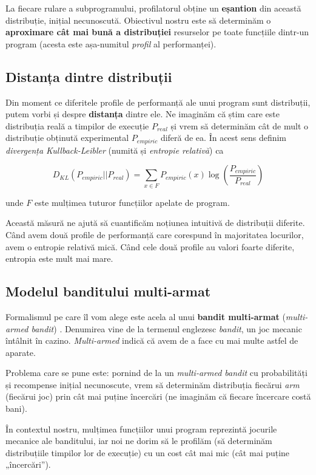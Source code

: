 La fiecare rulare a subprogramului, profilatorul obține un \textbf{eșantion} din această distribuție, inițial necunoscută. Obiectivul nostru este să determinăm o \textbf{aproximare cât mai bună a distribuției} resurselor pe toate funcțiile dintr-un program (acesta este așa-numitul \emph{profil} al performanței).

\subsection{Distanța dintre distribuții}

Din moment ce diferitele profile de performanță ale unui program sunt distribuții, putem vorbi și despre \textbf{distanța} dintre ele. Ne imaginăm că știm care este distribuția reală a timpilor de execuție \(P_{real}\) și vrem să determinăm cât de mult o distribuție obținută experimental \(P_{empiric}\) diferă de ea. În acest sens definim \emph{divergența Kullback-Leibler} (numită și \emph{entropie relativă}) \cite{kullback_leibler_divergence} ca

\[D_{KL} (P_{empiric} || P_{real}) = \sum_{x \in F} P_{empiric} (x) \log \left(\frac{P_{empiric}}{P_{real}}\right) \]

unde \(F\) este mulțimea tuturor funcțiilor apelate de program.

Această măsură ne ajută să cuantificăm noțiunea intuitivă de distribuții diferite. Când avem două profile de performanță care corespund în majoritatea locurilor, avem o entropie relativă mică. Când cele două profile au valori foarte diferite, entropia este mult mai mare.

\subsection{Modelul banditului multi-armat}

Formalismul pe care îl vom alege este acela al unui \textbf{bandit multi-armat} (\textit{multi-armed bandit}) \cite{multi_armed_bandit}. Denumirea vine de la termenul englezesc \textit{bandit}, un joc mecanic întâlnit în cazino. \textit{Multi-armed} indică că avem de a face cu mai multe astfel de aparate.

Problema care se pune este: pornind de la un \textit{multi-armed bandit} cu probabilități și recompense inițial necunoscute, vrem să determinăm distribuția fiecărui \textit{arm} (fiecărui joc) prin cât mai puține încercări (ne imaginăm că fiecare încercare costă bani).

În contextul nostru, mulțimea funcțiilor unui program reprezintă jocurile mecanice ale banditului, iar noi ne dorim să le profilăm (să determinăm distribuțiile timpilor lor de execuție) cu un cost cât mai mic (cât mai puține „încercări”).